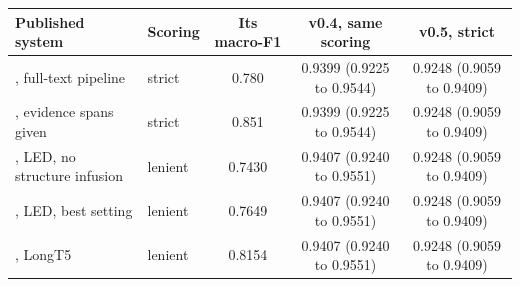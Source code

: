 \begin{tabular}{>{\raggedright\arraybackslash}p{6.0cm}lccc}
\toprule
Published system & Scoring & Its macro-F1 & v0.4, same scoring & v0.5, strict \\
\midrule
\citet{deyoung2020}, full-text pipeline & strict & 0.780 & 0.9399 {\scriptsize (0.9225 to 0.9544)} & 0.9248 {\scriptsize (0.9059 to 0.9409)} \\[1pt]
\citet{deyoung2020}, evidence spans given & strict & 0.851 & 0.9399 {\scriptsize (0.9225 to 0.9544)} & 0.9248 {\scriptsize (0.9059 to 0.9409)} \\[1pt]
\citet{buchmann2024structure}, LED, no structure infusion & lenient & 0.7430 & 0.9407 {\scriptsize (0.9240 to 0.9551)} & 0.9248 {\scriptsize (0.9059 to 0.9409)} \\[1pt]
\citet{buchmann2024structure}, LED, best setting & lenient & 0.7649 & 0.9407 {\scriptsize (0.9240 to 0.9551)} & 0.9248 {\scriptsize (0.9059 to 0.9409)} \\[1pt]
\citet{buchmann2024structure}, LongT5 & lenient & 0.8154 & 0.9407 {\scriptsize (0.9240 to 0.9551)} & 0.9248 {\scriptsize (0.9059 to 0.9409)} \\[1pt]
\bottomrule
\end{tabular}
